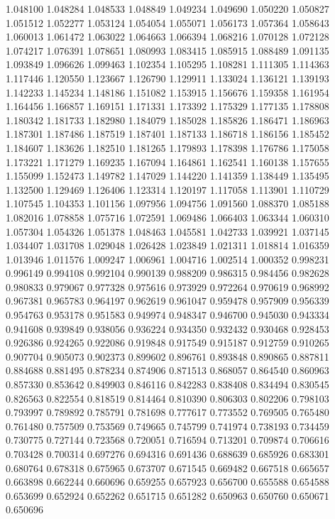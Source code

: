 1.048100
1.048284
1.048533
1.048849
1.049234
1.049690
1.050220
1.050827
1.051512
1.052277
1.053124
1.054054
1.055071
1.056173
1.057364
1.058643
1.060013
1.061472
1.063022
1.064663
1.066394
1.068216
1.070128
1.072128
1.074217
1.076391
1.078651
1.080993
1.083415
1.085915
1.088489
1.091135
1.093849
1.096626
1.099463
1.102354
1.105295
1.108281
1.111305
1.114363
1.117446
1.120550
1.123667
1.126790
1.129911
1.133024
1.136121
1.139193
1.142233
1.145234
1.148186
1.151082
1.153915
1.156676
1.159358
1.161954
1.164456
1.166857
1.169151
1.171331
1.173392
1.175329
1.177135
1.178808
1.180342
1.181733
1.182980
1.184079
1.185028
1.185826
1.186471
1.186963
1.187301
1.187486
1.187519
1.187401
1.187133
1.186718
1.186156
1.185452
1.184607
1.183626
1.182510
1.181265
1.179893
1.178398
1.176786
1.175058
1.173221
1.171279
1.169235
1.167094
1.164861
1.162541
1.160138
1.157655
1.155099
1.152473
1.149782
1.147029
1.144220
1.141359
1.138449
1.135495
1.132500
1.129469
1.126406
1.123314
1.120197
1.117058
1.113901
1.110729
1.107545
1.104353
1.101156
1.097956
1.094756
1.091560
1.088370
1.085188
1.082016
1.078858
1.075716
1.072591
1.069486
1.066403
1.063344
1.060310
1.057304
1.054326
1.051378
1.048463
1.045581
1.042733
1.039921
1.037145
1.034407
1.031708
1.029048
1.026428
1.023849
1.021311
1.018814
1.016359
1.013946
1.011576
1.009247
1.006961
1.004716
1.002514
1.000352
0.998231
0.996149
0.994108
0.992104
0.990139
0.988209
0.986315
0.984456
0.982628
0.980833
0.979067
0.977328
0.975616
0.973929
0.972264
0.970619
0.968992
0.967381
0.965783
0.964197
0.962619
0.961047
0.959478
0.957909
0.956339
0.954763
0.953178
0.951583
0.949974
0.948347
0.946700
0.945030
0.943334
0.941608
0.939849
0.938056
0.936224
0.934350
0.932432
0.930468
0.928453
0.926386
0.924265
0.922086
0.919848
0.917549
0.915187
0.912759
0.910265
0.907704
0.905073
0.902373
0.899602
0.896761
0.893848
0.890865
0.887811
0.884688
0.881495
0.878234
0.874906
0.871513
0.868057
0.864540
0.860963
0.857330
0.853642
0.849903
0.846116
0.842283
0.838408
0.834494
0.830545
0.826563
0.822554
0.818519
0.814464
0.810390
0.806303
0.802206
0.798103
0.793997
0.789892
0.785791
0.781698
0.777617
0.773552
0.769505
0.765480
0.761480
0.757509
0.753569
0.749665
0.745799
0.741974
0.738193
0.734459
0.730775
0.727144
0.723568
0.720051
0.716594
0.713201
0.709874
0.706616
0.703428
0.700314
0.697276
0.694316
0.691436
0.688639
0.685926
0.683301
0.680764
0.678318
0.675965
0.673707
0.671545
0.669482
0.667518
0.665657
0.663898
0.662244
0.660696
0.659255
0.657923
0.656700
0.655588
0.654588
0.653699
0.652924
0.652262
0.651715
0.651282
0.650963
0.650760
0.650671
0.650696
